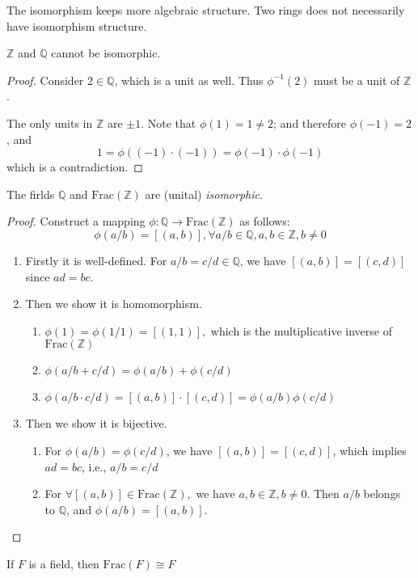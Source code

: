 The isomorphism keeps more algebraic structure. Two rings does not necessarily have isomorphism structure.
\begin{proposition}
$\mathbb{Z}$ and $\mathbb{Q}$ cannot be isomorphic.
\end{proposition}
\begin{proof}
Consider $2\in\mathbb{Q}$, which is a unit as well. Thus $\phi^{-1}(2)$ must be a unit of $\mathbb{Z}$.

The only units in $\mathbb{Z}$ are $\pm1$. Note that $\phi(1)=1\ne2$; and therefore $\phi(-1)=2$, and
\[
1=\phi((-1)\cdot(-1))=\phi(-1)\cdot\phi(-1)
\]
which is a contradiction.
\end{proof}
\begin{theorem}
The firlds $\mathbb{Q}$ and $\mbox{Frac}(\mathbb{Z})$ are (unital) \emph{isomorphic}.
\end{theorem}
\begin{proof}
Construct a mapping $\phi:\mathbb{Q}\to\mbox{Frac}(\mathbb{Z})$ as follows:
\[
\phi(a/b)=[(a,b)],\forall a/b\in\mathbb{Q},a,b\in\mathbb{Z},b\ne0
\]
\begin{enumerate}
\item
Firstly it is well-defined. For $a/b=c/d\in\mathbb{Q}$, we have $[(a,b)]=[(c,d)]$ since $ad=bc$.
\item
Then we show it is homomorphism.
\begin{enumerate}
\item
$\phi(1)=\phi(1/1)=[(1,1)],$ which is the multiplicative inverse of $\mbox{Frac}(\mathbb{Z})$
\item
$\phi(a/b+c/d)=\phi(a/b)+\phi(c/d)$
\item
$\phi(a/b\cdot c/d)=[(a,b)]\cdot[(c,d)]=\phi(a/b)\phi(c/d)$
\end{enumerate}
\item
Then we show it is bijective.
\begin{enumerate}
\item
For $\phi(a/b)=\phi(c/d)$, we have $[(a,b)]=[(c,d)]$, which implies $ad=bc$, i.e., $a/b=c/d$
\item
For $\forall[(a,b)]\in\mbox{Frac}(\mathbb{Z}),$ we have $a,b\in\mathbb{Z},b\ne0$. Then $a/b$ belongs to $\mathbb{Q}$, and $\phi(a/b)=[(a,b)]$.
\end{enumerate}
\end{enumerate}
\end{proof}
\begin{theorem}
If $F$ is a field, then $\mbox{Frac}(F)\cong F$
\end{theorem}

